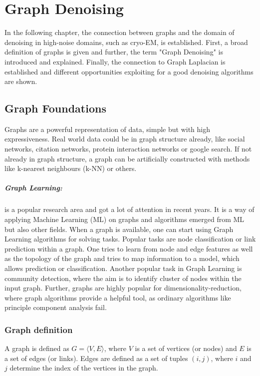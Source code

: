 \chapter{Graph Denoising}
In the following chapter, the connection between graphs and the domain of denoising in high-noise 
domains, such as cryo-EM, is established.
First, a broad definition of graphs is given and further, the term "Graph Denoising" is
introduced and explained. Finally, the connection to Graph Laplacian is established
and different opportunities exploiting for a good denoising algorithms are shown.


\section{Graph Foundations}
Graphs are a powerful representation of data, simple but with high expressiveness. 
Real world data could be in graph structure already, like social networks, citation networks,
protein interaction networks or google search. 
If not already in graph structure, a graph can be artificially constructed with methods like k-nearest neighbours (k-NN) or others.

\paragraph{Graph Learning:} is a popular research area and got a lot of attention in recent years.
It is a way of applying Machine Learning (ML) on graphs and algorithms emerged from ML but also other fields.
When a graph is available, one can start using Graph Learning algorithms for solving tasks.
Popular tasks are node classification or link prediction within a graph. One tries to learn from node and edge features 
as well as the topology of the graph and tries to map information to a model, which allows prediction or classification.
Another popular task in Graph Learning is community detection, where the aim is to identify cluster of nodes within the input graph.
Further, graphs are highly popular for dimensionality-reduction, where 
graph algorithms provide a helpful tool, as ordinary algorithms like principle component analysis fail.

\subsection{Graph definition}
A graph is defined as  $G = \langle V,E \rangle$, where $V$ is a set of 
vertices (or nodes) and $E$ is a set of edges (or links). 
Edges are defined as a set of tuples $(i, j)$, where $i$ and $j$ determine the index of the vertices in the graph.

